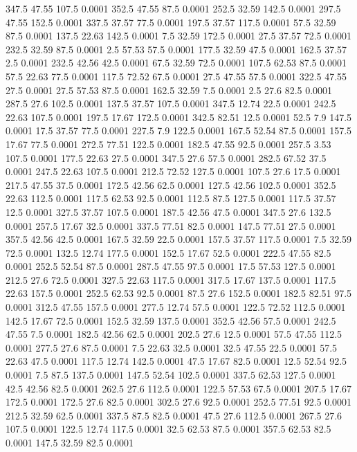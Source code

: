 347.5	47.55	107.5	0.0001
352.5	47.55	87.5	0.0001
252.5	32.59	142.5	0.0001
297.5	47.55	152.5	0.0001
337.5	37.57	77.5	0.0001
197.5	37.57	117.5	0.0001
57.5	32.59	87.5	0.0001
137.5	22.63	142.5	0.0001
7.5	32.59	172.5	0.0001
27.5	37.57	72.5	0.0001
232.5	32.59	87.5	0.0001
2.5	57.53	57.5	0.0001
177.5	32.59	47.5	0.0001
162.5	37.57	2.5	0.0001
232.5	42.56	42.5	0.0001
67.5	32.59	72.5	0.0001
107.5	62.53	87.5	0.0001
57.5	22.63	77.5	0.0001
117.5	72.52	67.5	0.0001
27.5	47.55	57.5	0.0001
322.5	47.55	27.5	0.0001
27.5	57.53	87.5	0.0001
162.5	32.59	7.5	0.0001
2.5	27.6	82.5	0.0001
287.5	27.6	102.5	0.0001
137.5	37.57	107.5	0.0001
347.5	12.74	22.5	0.0001
242.5	22.63	107.5	0.0001
197.5	17.67	172.5	0.0001
342.5	82.51	12.5	0.0001
52.5	7.9	147.5	0.0001
17.5	37.57	77.5	0.0001
227.5	7.9	122.5	0.0001
167.5	52.54	87.5	0.0001
157.5	17.67	77.5	0.0001
272.5	77.51	122.5	0.0001
182.5	47.55	92.5	0.0001
257.5	3.53	107.5	0.0001
177.5	22.63	27.5	0.0001
347.5	27.6	57.5	0.0001
282.5	67.52	37.5	0.0001
247.5	22.63	107.5	0.0001
212.5	72.52	127.5	0.0001
107.5	27.6	17.5	0.0001
217.5	47.55	37.5	0.0001
172.5	42.56	62.5	0.0001
127.5	42.56	102.5	0.0001
352.5	22.63	112.5	0.0001
117.5	62.53	92.5	0.0001
112.5	87.5	127.5	0.0001
117.5	37.57	12.5	0.0001
327.5	37.57	107.5	0.0001
187.5	42.56	47.5	0.0001
347.5	27.6	132.5	0.0001
257.5	17.67	32.5	0.0001
337.5	77.51	82.5	0.0001
147.5	77.51	27.5	0.0001
357.5	42.56	42.5	0.0001
167.5	32.59	22.5	0.0001
157.5	37.57	117.5	0.0001
7.5	32.59	72.5	0.0001
132.5	12.74	177.5	0.0001
152.5	17.67	52.5	0.0001
222.5	47.55	82.5	0.0001
252.5	52.54	87.5	0.0001
287.5	47.55	97.5	0.0001
17.5	57.53	127.5	0.0001
212.5	27.6	72.5	0.0001
327.5	22.63	117.5	0.0001
317.5	17.67	137.5	0.0001
117.5	22.63	157.5	0.0001
252.5	62.53	92.5	0.0001
87.5	27.6	152.5	0.0001
182.5	82.51	97.5	0.0001
312.5	47.55	157.5	0.0001
277.5	12.74	57.5	0.0001
122.5	72.52	112.5	0.0001
142.5	17.67	72.5	0.0001
152.5	32.59	137.5	0.0001
352.5	42.56	57.5	0.0001
242.5	47.55	7.5	0.0001
182.5	42.56	62.5	0.0001
202.5	27.6	12.5	0.0001
57.5	47.55	112.5	0.0001
277.5	27.6	87.5	0.0001
7.5	22.63	32.5	0.0001
32.5	47.55	22.5	0.0001
57.5	22.63	47.5	0.0001
117.5	12.74	142.5	0.0001
47.5	17.67	82.5	0.0001
12.5	52.54	92.5	0.0001
7.5	87.5	137.5	0.0001
147.5	52.54	102.5	0.0001
337.5	62.53	127.5	0.0001
42.5	42.56	82.5	0.0001
262.5	27.6	112.5	0.0001
122.5	57.53	67.5	0.0001
207.5	17.67	172.5	0.0001
172.5	27.6	82.5	0.0001
302.5	27.6	92.5	0.0001
252.5	77.51	92.5	0.0001
212.5	32.59	62.5	0.0001
337.5	87.5	82.5	0.0001
47.5	27.6	112.5	0.0001
267.5	27.6	107.5	0.0001
122.5	12.74	117.5	0.0001
32.5	62.53	87.5	0.0001
357.5	62.53	82.5	0.0001
147.5	32.59	82.5	0.0001
